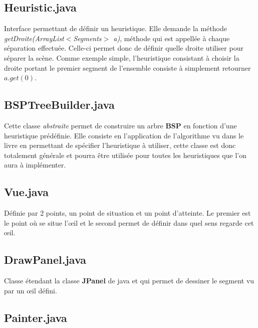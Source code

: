 \documentclass{article}
\begin{document}
\subsection{Heuristic.java}

Interface permettant de définir un heuristique. Elle demande la méthode 
\textit{getDroite(ArrayList$<$Segments$>$ a)}, méthode qui est appellée à chaque séparation 
effectuée. Celle-ci permet donc de définir quelle droite utiliser pour séparer la scène. Comme 
exemple simple, l'heuristique consistant à choisir la droite portant le premier segment de 
l'ensemble consiste à simplement retourner $a.get(0)$.

\subsection{BSPTreeBuilder.java}

Cette classe \textit{abstraite} permet de construire un arbre \textbf{BSP} en fonction d'une 
heuristique prédéfinie. Elle consiste en l'application de l'algorithme vu dans le livre en 
permettant de spécifier l'heuristique à utiliser, cette classe est donc totalement générale et 
pourra être utilisée pour toutes les heuristiques que l'on aura à implémenter.

\subsection{Vue.java}

Définie par 2 points, un point de situation et un point d'atteinte. Le premier est le point où se 
situe l'\oe il et le second permet de définir dans quel sens regarde cet \oe il.

\subsection{DrawPanel.java}

Classe étendant la classe \textbf{JPanel} de java et qui permet de dessiner le segment vu par un
\oe il défini.

\subsection{Painter.java}
\end{document}
